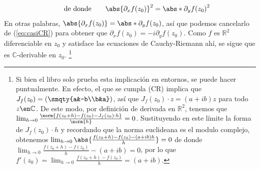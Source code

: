\begin{sol}
\begin{enumerate}[label=(\alph*),leftmargin=1.5em]
\[\qquad\text{de donde}\qquad
\abs{\partial_xf(z_0)}^2=\abs*{\partial_yf(z_0)}^2
\]
En otras palabras, $\abs{\partial_xf(z_0)}=\abs*{\partial_yf(z_0)}$, así que podemos cancelarlo de (\ref{eq:casiCR}) para obtener que $\partial_xf(z_0) = -i\partial_yf(z_0)$. Como $f$ es $\mathbb{R}^2$ diferenciable en $z_0$ y satisface las ecuaciones de Cauchy-Riemann ahí, se sigue que es $\mathbb{C}$-derivable en $z_0$.%
\footnote{
    Si bien el libro solo prueba esta implicación en entornos, se puede hacer puntualmente. En efecto, el que se cumpla (CR) implica que $J_f(z_0) = \left(\smqty{a&-b\\b&a}\right)$, así que $J_f(z_0)\cdot z = (a+ib)z$ para todo $z\en\mathbb{C}$. De este modo, por definición de derivada en $\mathbb{R}^2$, tenemos que $\lim_{h\to0}\frac{\norm{f(z_0+h)-f(z_0)-J_f(z_0)\cdot h}}{\norm{h}}=0$. Sustituyendo en este límite la forma de $J_f(z_0)\cdot h$ y recordando que la norma euclideana es el modulo complejo, obtenemos $\lim_{h\to0}\abs{\frac{f(z_0+h)-f(z_0)-(a+ib)h}{h}}=0$ de donde $\lim_{h\to0}\frac{f(z_0+h)-f(z_0)}{h}-(a+ib) = 0$, por lo que  $f'(z_0) = \lim_{h\to0}\frac{f(z_0+h)-f(z_0)}{h} = (a+ib)$.
}
\end{enumerate}
\end{sol}